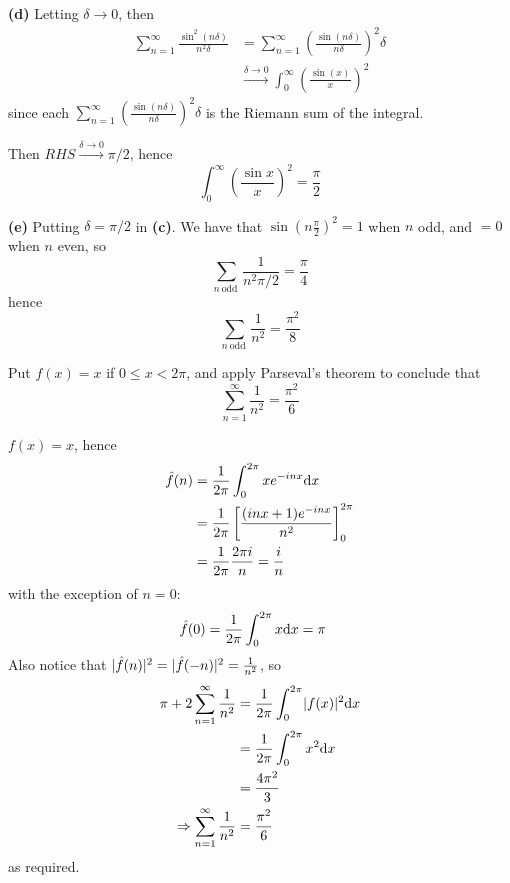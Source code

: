\documentclass[a4paper, 12pt]{article}
\begin{document}
\begin{solution}
    \textbf{(d)} Letting $\delta \to 0$, then
    \begin{align*}
        \sum_{n=1}^{\infty} \frac{\sin^2(n\delta)}{n^2\delta} &= \sum_{n=1}^{\infty} \left(\frac{\sin(n\delta)}{n\delta}\right)^2 \delta \\
        &\xrightarrow{\delta \to 0} \int_{0}^{\infty} \left(\frac{\sin (x)}{x}\right)^2
    \end{align*}
    since each $\sum_{n=1}^{\infty} \left(\frac{\sin(n\delta)}{n\delta}\right)^2 \delta$ is the Riemann sum of the integral.

    Then $RHS \xrightarrow{\delta \to 0} \pi/2$, hence \begin{equation*}
    \int_{0}^{\infty} \left(\frac{\sin x}{x}\right)^2 = \frac{\pi}{2}
    \end{equation*}

    \textbf{(e)} Putting $\delta = \pi/2$ in \textbf{(c)}. We have that $\sin(n\frac{\pi}{2})^2 = 1$ when $n$ odd, and $= 0$ when $n$ even, so
     \begin{equation*}
    \sum_{n \:\text{odd} \:} \frac{1}{n^2 \pi/2} = \frac{\pi}{4}
    \end{equation*}
    hence 
    \begin{equation*}
        \sum_{n \:\text{odd}\: } \frac{1}{n^2} = \frac{\pi^2}{8}
    \end{equation*}
\end{solution}

\begin{problem} 
    Put $f(x) = x$ if $0 \leq x < 2\pi$, and apply Parseval's theorem to conclude that \begin{equation*}
        \sum_{n=1}^{\infty} \frac{1}{n^2} = \frac{\pi^2}{6}
    \end{equation*}
\end{problem}
\begin{solution}
    $f(x) = x$, hence \begin{align*}
        \hat{f}(n) &= \frac{1}{2 \pi}\int_{0}^{2\pi} x e^{-inx} \mathrm{d} x \\
        &= \frac{1}{2 \pi}\left[\frac{(inx + 1)e^{-inx}}{n^2}\right]^{2\pi}_{0} \\
        &= \frac{1}{2 \pi}\frac{2\pi i}{n} = \frac{i}{n}
    \end{align*}
    with the exception of $n = 0$:
    \begin{align*}
        \hat{f}(0) &= \frac{1}{2\pi} \int_{0}^{2\pi} x \mathrm{d} x = \pi
    \end{align*}
    Also notice that $\lvert\hat{f}(n)\rvert^2 = \lvert\hat{f}(-n)\rvert^2 = \frac{1}{n^2}$, so 
    \begin{align*}
        \pi + 2\sum_{n=1}^{\infty} \frac{1}{n^2} &= \frac{1}{2\pi} \int_{0}^{2\pi} \lvert f(x)\rvert^2 \mathrm{d} x \\
        &= \frac{1}{2\pi} \int_{0}^{2\pi} x^2 \mathrm{d} x \\
        &= \frac{4\pi^2}{3} \\
        \Rightarrow \sum_{n=1}^{\infty} \frac{1}{n^2} &= \frac{\pi^2}{6}
    \end{align*}
    as required.
\end{solution}
\end{document}
